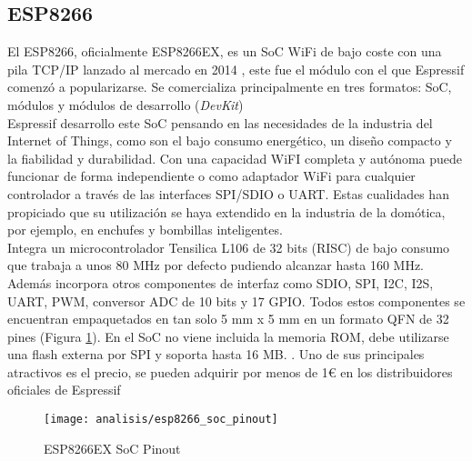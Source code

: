 \documentclass[../proyecto.tex]{subfiles}
\begin{document}
\subsection{ESP8266}

El ESP8266, oficialmente ESP8266EX, es un SoC WiFi de bajo coste con una pila TCP/IP lanzado al mercado en 2014 \cite{esp8266_overview}, este fue el módulo con el que Espressif comenzó a popularizarse. Se comercializa principalmente en tres formatos: SoC, módulos y módulos de desarrollo (\textit{DevKit})\\

Espressif desarrollo este SoC pensando en las necesidades de la industria del Internet of Things, como son el bajo consumo energético, un diseño compacto y la fiabilidad y durabilidad. Con una capacidad WiFI completa y autónoma puede funcionar de forma independiente o como adaptador WiFi para cualquier controlador a través de las interfaces SPI/SDIO o UART. Estas cualidades han propiciado que su utilización se haya extendido en la industria de la domótica, por ejemplo, en enchufes y bombillas inteligentes. \\

Integra un microcontrolador Tensilica L106 de 32 bits (RISC) de bajo consumo que trabaja a unos 80 MHz por defecto pudiendo alcanzar hasta 160 MHz. Además incorpora otros componentes de interfaz como SDIO, SPI, I2C, I2S, UART, PWM, conversor ADC de 10 bits y 17 GPIO. Todos estos componentes se encuentran empaquetados en tan solo 5 mm x 5 mm en un formato QFN de 32 pines (Figura \ref{fig:esp8266_soc_pinout}). En el SoC no viene incluida la memoria ROM, debe utilizarse una flash externa por SPI y soporta hasta 16 MB. \cite{esp8266_datasheet}. Uno de sus principales atractivos es el precio, se pueden adquirir por menos de 1€ en los distribuidores oficiales de Espressif \cite{espressif_provider_digikey} \cite{espressif_provider_mouser}\\


\begin{figure}[H]
\centering
\texttt{[image: analisis/esp8266\_soc\_pinout]}
\caption{ESP8266EX SoC Pinout}
\label{fig:esp8266_soc_pinout}
\end{figure}
\end{document}
